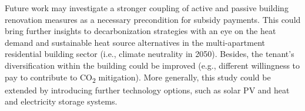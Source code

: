 Future work may investigate a stronger coupling of active and passive building renovation measures as a necessary precondition for subsidy payments. This could bring further insights to decarbonization  strategies with an eye on the heat demand and sustainable heat source alternatives in the multi-apartment residential building sector (i.e., climate neutrality in 2050).  Besides, the tenant's diversification within the building could be improved (e.g., different willingness to pay to contribute to CO\textsubscript{2} mitigation). More generally, this study could be extended by introducing further technology options, such as solar PV and heat and electricity storage systems. 




